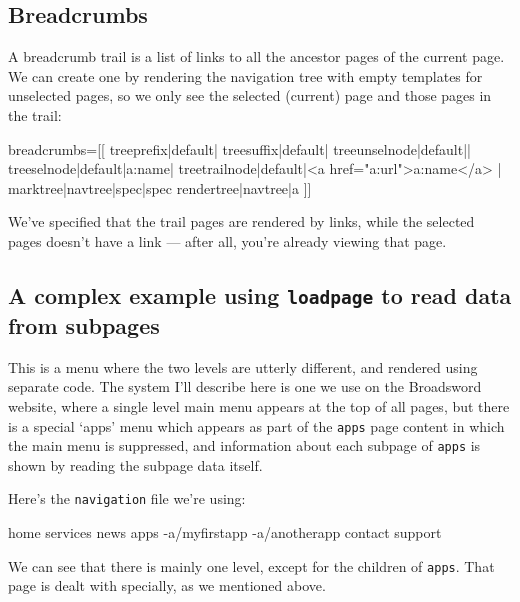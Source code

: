 \subsection{Breadcrumbs}
A breadcrumb trail is a list of links to all the ancestor pages of the current page. We can create
one by rendering the navigation tree with empty templates for unselected pages, so we only see
the selected (current) page and those pages in the trail:
\begin{MyVerbatim}
breadcrumbs=[[
{{treeprefix|default|}}
{{treesuffix|default|}}
{{treeunselnode|default||}}
{{treeselnode|default|{{a:name}}|}}
{{treetrailnode|default|<a href="{{a:url}}">{{a:name}}</a> |}}
{{marktree|{{navtree}}|spec|{{spec}}}}
{{rendertree|{{navtree}}|a}}
]]
\end{MyVerbatim}
We've specified that the trail pages are rendered by links, while the selected pages doesn't have
a link --- after all, you're already viewing that page.

\subsection{A complex example using \texttt{loadpage} to read data from subpages}
\label{loadpageexample}
This is a menu where the two levels are utterly different, and rendered using
separate code. The system I'll describe here is one we use on the Broadsword
website, where a single level main menu appears at the top of all pages, but
there is a special `apps' menu which appears as part of the \texttt{apps} page
content in which the main menu is suppressed, and information about each
subpage of \texttt{apps} is shown by reading the subpage data itself.

Here's the \texttt{navigation} file we're using:
\begin{MyVerbatim}
home
services
news
apps
-a/myfirstapp
-a/anotherapp
contact
support
\end{MyVerbatim}
We can see that there is mainly one level, except for the children of \texttt{apps}. That
page is dealt with specially, as we mentioned above.

